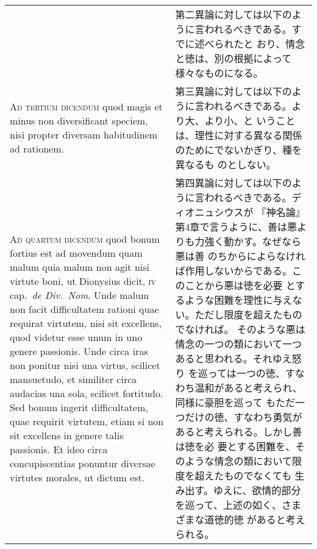 \documentclass[10pt]{jsarticle}
\begin{document}
\begin{longtable}{p{21em}p{21em}}
&

 第二異論に対しては以下のように言われるべきである。すでに述べられたと
 おり、情念と徳は、別の根拠によって様々なものになる。
 
\\

 {\scshape Ad tertium dicendum} quod magis et minus non diversificant
 speciem, nisi propter diversam habitudinem ad rationem.
 
&

 第三異論に対しては以下のように言われるべきである。より大、より小、と
 いうことは、理性に対する異なる関係のためにでないかぎり、種を異なるも
 のとしない。
 
\\


 {\scshape Ad quartum dicendum} quod bonum fortius est ad movendum
 quam malum quia malum non agit nisi virtute boni, ut Dionysius dicit,
 {\scshape iv} cap.~{\itshape de Div.~Nom}. Unde malum non facit
 difficultatem rationi quae requirat virtutem, nisi sit excellens,
 quod videtur esse unum in uno genere passionis. Unde circa iras non
 ponitur nisi una virtus, scilicet mansuetudo, et similiter circa
 audacias una sola, scilicet fortitudo. Sed bonum ingerit
 difficultatem, quae requirit virtutem, etiam si non sit excellens in
 genere talis passionis. Et ideo circa concupiscentias ponuntur
 diversae virtutes morales, ut dictum est.
 
&

 第四異論に対しては以下のように言われるべきである。ディオニュシウスが
 『神名論』第4章で言うように、善は悪よりも力強く動かす。なぜなら悪は善
 のちからによらなければ作用しないからである。このことから悪は徳を必要
 とするような困難を理性に与えない。ただし限度を超えたものでなければ。
 そのような悪は情念の一つの類において一つあると思われる。それゆえ怒り
 を巡っては一つの徳、すなわち温和があると考えられ、同様に豪胆を巡って
 もただ一つだけの徳、すなわち勇気があると考えられる。しかし善は徳を必
 要とする困難を、そのような情念の類において限度を超えたものでなくても
 生み出す。ゆえに、欲情的部分を巡って、上述の如く、さまざまな道徳的徳
 があると考えられる。

\end{longtable}
\end{document}
